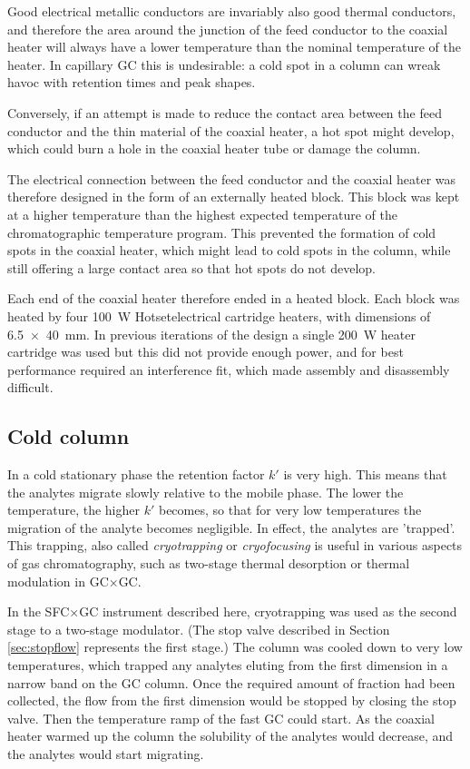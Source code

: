 Good electrical metallic conductors are invariably also good thermal conductors,
and therefore the area around the junction of the feed conductor to the coaxial
heater will always have a lower temperature than the nominal temperature of the
heater. In capillary GC this is undesirable: a cold spot in a column can wreak
havoc with retention times and peak shapes.

Conversely, if an attempt is made to reduce the contact area between the feed
conductor and the thin material of the coaxial heater, a hot spot might develop,
which could burn a hole in the coaxial heater tube or damage the column.

The electrical connection between the feed conductor and the coaxial heater was
therefore designed in the form of an externally heated block. This block was
kept at a higher temperature than the highest expected temperature of the
chromatographic temperature program. This prevented the formation of cold spots
in the coaxial heater, which might lead to cold spots in the column, while still
offering a large contact area so that hot spots do not develop.

Each end of the coaxial heater therefore ended in a heated block. Each block was
heated by four \SI{100}{\watt} Hotset\texttrademark{}electrical cartridge
heaters, with dimensions of \SI{6.5 x 40}{\milli\metre}. In previous iterations
of the design a single \SI{200}{\watt} heater cartridge was used but this did
not provide enough power, and for best performance required an interference fit,
which made assembly and disassembly difficult.
 
\subsection{Cold column}

In a cold stationary phase the retention factor \(k'\) is very high. This means
that the analytes migrate slowly relative to the mobile phase. The lower the
temperature, the higher \(k'\) becomes, so that for very low temperatures the
migration of the analyte becomes negligible. In effect, the analytes are
'trapped'. This trapping, also called \textit{cryotrapping} or
\textit{cryofocusing} is useful in various aspects of gas chromatography, such
as two-stage thermal desorption or thermal modulation in GC×GC. 


In the SFC×GC instrument described here, cryotrapping was used as the second
stage to a two-stage modulator. (The stop valve described in Section
\ref{sec:stopflow} represents the first stage.) The column was cooled down to
very low temperatures, which trapped any analytes eluting from the first
dimension in a narrow band on the GC column. Once the required amount of
fraction had been collected, the flow from the first dimension would be stopped
by closing the stop valve. Then the temperature ramp of the fast GC could start.
As the coaxial heater warmed up the column the solubility of the analytes would
decrease, and the analytes would start migrating.

